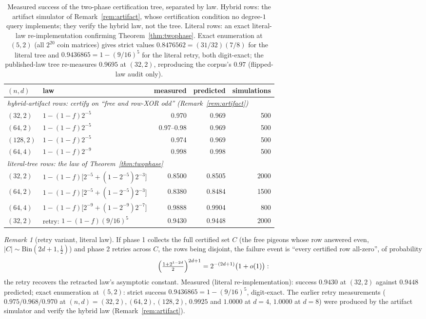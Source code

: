 \documentclass[11pt]{article}
\theoremstyle{definition}
\theoremstyle{remark}
\newtheorem{remark}[theorem]{Remark}
\begin{document}
\begin{table}[t]
\centering
\small
\begin{tabular}{llrrr}
\hline
$(n,d)$ & law & measured & predicted & simulations\\
\hline
\multicolumn{5}{l}{\emph{hybrid-artifact rows: certify on ``free and
row-XOR odd'' (Remark~\ref{rem:artifact})}}\\
$(32,2)$ & $1-(1-f)2^{-5}$ & 0.970 & 0.969 & 500\\
$(64,2)$ & $1-(1-f)2^{-5}$ & 0.97--0.98 & 0.969 & 500\\
$(128,2)$ & $1-(1-f)2^{-5}$ & 0.974 & 0.969 & 500\\
$(64,4)$ & $1-(1-f)2^{-9}$ & 0.998 & 0.998 & 500\\
\multicolumn{5}{l}{\emph{literal-tree rows: the law of
Theorem~\ref{thm:twophase}}}\\
$(32,2)$ & $1-(1-f)\bigl[2^{-5}+(1-2^{-5})2^{-3}\bigr]$
& 0.8500 & 0.8505 & 2000\\
$(64,2)$ & $1-(1-f)\bigl[2^{-5}+(1-2^{-5})2^{-3}\bigr]$
& 0.8380 & 0.8484 & 1500\\
$(64,4)$ & $1-(1-f)\bigl[2^{-9}+(1-2^{-9})2^{-7}\bigr]$
& 0.9888 & 0.9904 & 800\\
$(32,2)$ & retry: $1-(1-f)(9/16)^{5}$ & 0.9430 & 0.9448 & 2000\\
\hline
\end{tabular}
\caption{Measured success of the two-phase certification tree,
separated by law.  Hybrid rows: the artifact simulator of
Remark~\ref{rem:artifact}, whose certification condition no degree-$1$
query implements; they verify the hybrid law, not the tree.  Literal
rows: an exact literal-law re-implementation confirming
Theorem~\ref{thm:twophase}.  Exact enumeration at $(5,2)$ (all
$2^{20}$ coin matrices) gives strict values $0.8476562=(31/32)(7/8)$
for the literal tree and $0.9436865=1-(9/16)^5$ for the literal retry,
both digit-exact; the published-law tree re-measures $0.9695$ at
$(32,2)$, reproducing the corpus's $0.97$ (flipped-law audit only).}
\label{tab:twophase}
\end{table}

\begin{remark}[retry variant, literal law]\label{rem:retry}
If phase 1 collects the full certified set $C$ (the free pigeons whose
row answered even, $|C|\sim\mathrm{Bin}(2d+1,\tfrac12)$) and phase 2
retries across $C$, the rows being disjoint, the failure event is
``every certified row all-zero'', of probability
\[
\Bigl(\tfrac{1+2^{1-2d}}{2}\Bigr)^{2d+1}
=2^{-(2d+1)}\bigl(1+o(1)\bigr):
\]
the retry recovers the retracted law's asymptotic constant.  Measured
(literal re-implementation): success $0.9430$ at $(32,2)$ against
$0.9448$ predicted; exact enumeration at $(5,2)$: strict success
$0.9436865=1-(9/16)^5$, digit-exact.  The earlier retry measurements
($0.975/0.968/0.970$ at $(n,d)=(32,2),(64,2),(128,2)$, $0.9925$ and
$1.0000$ at $d=4$, $1.0000$ at $d=8$) were produced by the artifact
simulator and verify the hybrid law (Remark~\ref{rem:artifact}).
\end{remark}
\end{document}

